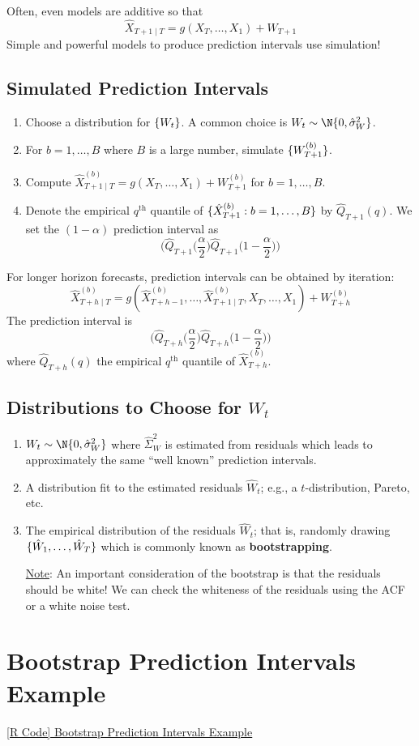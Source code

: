 Often, even models are additive so that
\[ \hat{X}_{T+1\mid T}=g(X_T,\ldots,X_1)+W_{T+1} \]
Simple and powerful models to produce prediction intervals
use simulation!
\subsection*{Simulated Prediction Intervals}
\begin{enumerate}[(1)]
      \item Choose a distribution for $ \{W_t\} $. A common choice is $ W_t \sim \N{0,\hat{\sigma}_W^2} $.
      \item For $ b=1,\ldots,B $ where $ B $ is a large number, simulate $ \{W_{T+1}^{(b)}\} $.
      \item Compute $ \hat{X}_{T+1\mid T}^{(b)}=g(X_{T},\ldots,X_1)+W_{T+1}^{(b)} $
            for $ b=1,\ldots,B $.
      \item Denote the empirical $ q^{\text{th}} $ quantile of $ \{\hat{X}_{T+1}^{(b)}:b=1,\ldots,B\} $
            by $ \hat{Q}_{T+1}(q) $. We set the $ (1-\alpha) $ prediction interval as
            \[ \biggl(\hat{Q}_{T+1}\biggl(\frac{\alpha}{2} \biggr)\hat{Q}_{T+1}\biggl(1-\frac{\alpha}{2} \biggr)\biggr) \]
\end{enumerate}
\begin{Remark}{}{}
      For longer horizon forecasts, prediction intervals can be obtained by iteration:
      \[ \hat{X}_{T+h\mid T}^{(b)}=g(\hat{X}_{T+h-1}^{(b)},\ldots,\hat{X}_{T+1\mid T}^{(b)},X_T,\ldots,X_1)+W_{T+h}^{(b)} \]
      The prediction interval is
      \[ \biggl(\hat{Q}_{T+h}\biggl(\frac{\alpha}{2} \biggr)\hat{Q}_{T+h}\biggl(1-\frac{\alpha}{2} \biggr)\biggr) \]
      where $ \hat{Q}_{T+h}(q) $ the empirical $ q^{\text{th}} $ quantile of $ \hat{X}_{T+h}^{(b)} $.
\end{Remark}
\subsection*{Distributions to Choose for $ W_t $}
\begin{enumerate}[(1)]
      \item $ W_t \sim \N{0,\hat{\sigma}_W^2} $ where $ \hat{\Sigma}_W^2 $ is estimated from residuals which
            leads to approximately the same ``well known'' prediction intervals.
      \item A distribution fit to the estimated residuals $ \hat{W}_t $; e.g., a $ t $-distribution,
            Pareto, etc.
      \item The empirical distribution of the residuals $ \hat{W}_t $; that is,
            randomly drawing $ \{\hat{W}_1,\ldots,\hat{W}_{T}\} $ which is commonly known
            as \textbf{bootstrapping}.

            \underline{Note}: An important consideration of the bootstrap is that the residuals should be white!
            We can check the whiteness of the residuals using the ACF or a white noise test.
\end{enumerate}
\section{Bootstrap Prediction Intervals Example}
\href{https://github.com/Hextical/university-notes/blob/master/year-3/semester-2/STAT%20443/code/6.6%20-%20Bootstrap%20Prediction%20Intervals%20Example.R}{[R Code] Bootstrap Prediction Intervals Example}

